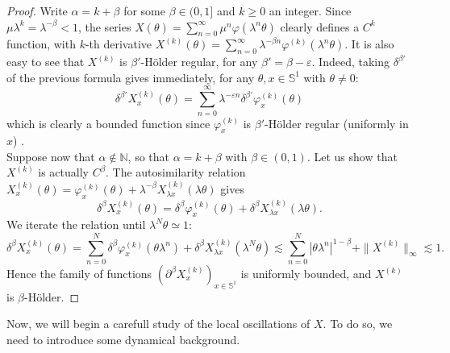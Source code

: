 \documentclass[11pt]{amsart}
\theoremstyle{plain}
\theoremstyle{definition}
\numberwithin{equation}{section}
\begin{document}
\begin{proof}
Write $\alpha=k+\beta$ for some $\beta \in (0,1]$ and $k \geq 0$ an integer. Since $\mu \lambda^k = \lambda^{-\beta}<1$, the series $X(\theta) = \sum_{n=0}^\infty \mu^n \varphi(\lambda^n \theta)$ clearly defines a $C^k$ function, with $k$-th derivative $X^{(k)}(\theta) = \sum_{n=0}^\infty \lambda^{-\beta n} \varphi^{(k)}(\lambda^n \theta)$. It is also easy to see that $X^{(k)}$ is $\beta'$-Hölder regular, for any $\beta'=\beta-\varepsilon$. Indeed, taking $\delta^{\beta'}$ of the previous formula gives immediately, for any $\theta,x \in \mathbb{S}^1$ with $\theta \neq 0$:
$$\delta^{\beta'} X_x^{(k)}(\theta) = \sum_{n=0}^\infty \lambda^{-\varepsilon n} \delta^{\beta'} \varphi_x^{(k)}(\theta)  $$
which is clearly a bounded function since $\varphi_x^{(k)}$ is $\beta'$-Hölder regular (uniformly in $x$) . \\
Suppose now that $\alpha \notin \mathbb{N}$, so that $\alpha = k+\beta$ with $\beta \in (0,1)$. Let us show that $X^{(k)}$ is actually $C^\beta$. The autosimilarity relation $X^{(k)}_x(\theta) = \varphi^{(k)}_x(\theta)+\lambda^{-\beta} X_{\lambda x}^{(k)}(\lambda \theta)$ gives
$$ \delta^\beta X^{(k)}_x(\theta) = \delta^\beta \varphi^{(k)}_x(\theta)+ \delta^\beta X_{\lambda x}^{(k)}(\lambda \theta). $$
We iterate the relation until $\lambda^N \theta \simeq 1$:
$$ \delta^\beta X^{(k)}_x(\theta) = \sum_{n=0}^N \delta^\beta \varphi^{(k)}_x(\theta \lambda^n)+ \delta^\beta X_{\lambda x}^{(k)}(\lambda^N \theta)  \lesssim \sum_{n=0}^N |\theta \lambda^n|^{1-\beta} +  \| X^{(k)} \|_\infty \lesssim 1 .$$
Hence the family of functions $(\partial^\beta X_x^{(k)
})_{x \in \mathbb{S}^1}$ is uniformly bounded, and $X^{(k)}$ is $\beta$-Hölder.
\end{proof}

Now, we will begin a carefull study of the local oscillations of $X$. To do so, we need to introduce some dynamical background. 
\end{document}
